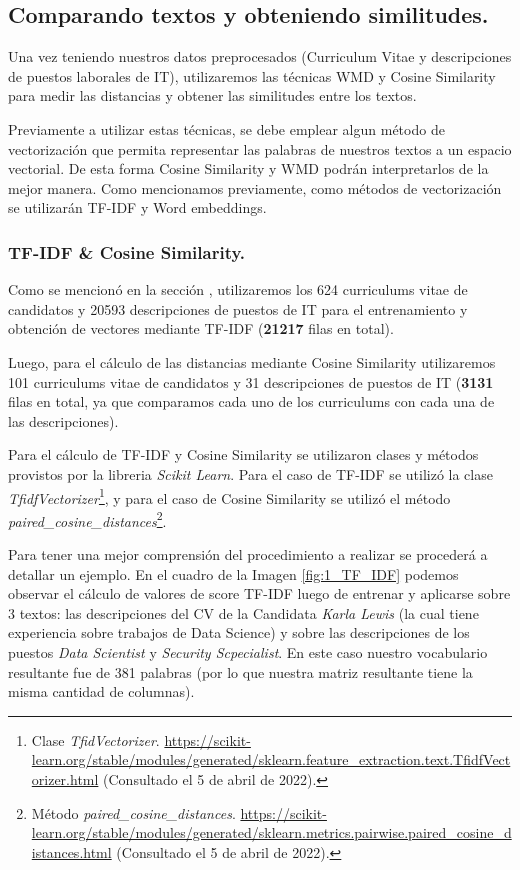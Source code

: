 \documentclass[12pt,a4paper]{article}
\begin{document}
\begin{sloppypar}
\subsection{Comparando textos y obteniendo similitudes.}

Una vez teniendo nuestros datos preprocesados (Curriculum Vitae y descripciones de puestos laborales de IT), utilizaremos las técnicas WMD y Cosine Similarity para medir las distancias y obtener las similitudes entre los textos. 

Previamente a utilizar estas técnicas, se debe emplear algun método de vectorización que permita representar las palabras de nuestros textos a un espacio vectorial. De esta forma Cosine Similarity y WMD podrán interpretarlos de la mejor manera. Como mencionamos previamente, como métodos de vectorización se utilizarán TF-IDF y Word embeddings. 

\subsubsection{TF-IDF \& Cosine Similarity.}

Como se mencionó en la sección \textit{}, utilizaremos los 624 curriculums vitae de candidatos y 20593 descripciones de puestos de IT para el entrenamiento y obtención de vectores mediante TF-IDF (\textbf{21217} filas en total).

Luego, para el cálculo de las distancias mediante Cosine Similarity utilizaremos 101 curriculums vitae de candidatos y 31 descripciones de puestos de IT (\textbf{3131} filas en total, ya que comparamos cada uno de los curriculums con cada una de las descripciones).

Para el cálculo de TF-IDF y Cosine Similarity se utilizaron clases y métodos provistos por la libreria \textit{Scikit Learn}. Para el caso de TF-IDF se utilizó la clase \textit{TfidfVectorizer}\footnote{Clase \textit{TfidVectorizer}. \url{https://scikit-learn.org/stable/modules/generated/sklearn.feature_extraction.text.TfidfVectorizer.html} (Consultado el 5 de abril de 2022).}, y para el caso de Cosine Similarity se utilizó el método \textit{paired\_cosine\_distances}\footnote{Método \textit{paired\_cosine\_distances}. \url{https://scikit-learn.org/stable/modules/generated/sklearn.metrics.pairwise.paired_cosine_distances.html} (Consultado el 5 de abril de 2022).}.

Para tener una mejor comprensión del procedimiento a realizar se procederá a detallar un ejemplo. En el cuadro de la Imagen \ref{fig:1_TF_IDF} podemos observar el cálculo de valores de score TF-IDF luego de entrenar y aplicarse sobre 3 textos: las descripciones del CV de la Candidata \textit{Karla Lewis} (la cual tiene experiencia sobre trabajos de Data Science) y sobre las descripciones de los puestos \textit{Data Scientist} y \textit{Security Scpecialist}. En este caso nuestro vocabulario resultante fue de 381 palabras (por lo que nuestra matriz resultante tiene la misma cantidad de columnas). 


\end{sloppypar}
\end{document}
